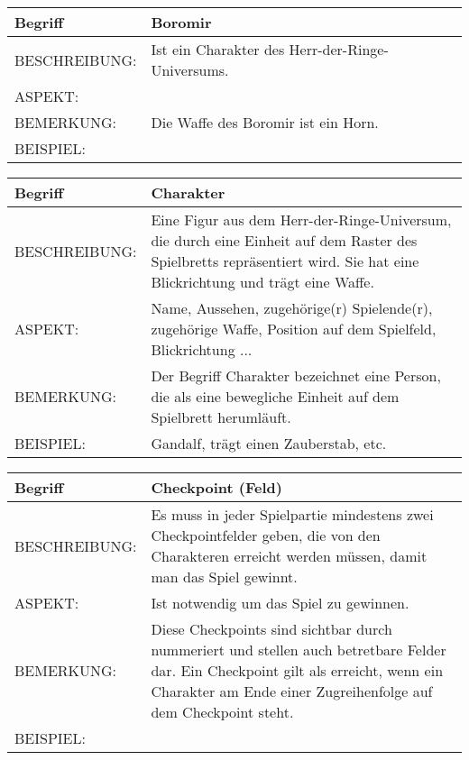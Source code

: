 \documentclass{uulm-assignment}
\begin{document}
	     \begin{tabularx}{\textwidth}{|l|X |} \hline
	        \textbf{Begriff} & \textbf{Boromir} \\
	        \hline
	        BESCHREIBUNG: & Ist ein Charakter des Herr-der-Ringe-Universums.                            \\
	        \hline
	        ASPEKT: &
	        \\
	        \hline
	        BEMERKUNG: & Die Waffe des Boromir ist ein Horn.\\
	        \hline
	        BEISPIEL: & \\
	        \hline
	    \end{tabularx}

	     \begin{tabularx}{\textwidth}{|l|X |} \hline
	        \textbf{Begriff} & \textbf{Charakter} \\
	        \hline
	        BESCHREIBUNG: & Eine Figur aus dem Herr-der-Ringe-Universum, die durch eine Einheit auf dem Raster des Spielbretts repräsentiert wird. Sie hat eine Blickrichtung und trägt eine Waffe. \\
	        \hline
	        ASPEKT: &Name, Aussehen, zugehörige(r) Spielende(r), zugehörige Waffe, Position auf dem Spielfeld, Blickrichtung ...
	        \\
	        \hline
	        BEMERKUNG: & Der Begriff Charakter bezeichnet eine Person, die als eine bewegliche Einheit auf dem Spielbrett herumläuft.\\
	        \hline
	        BEISPIEL: & Gandalf, trägt einen Zauberstab, etc.\\
	        \hline
	    \end{tabularx}

	     \begin{tabularx}{\textwidth}{|l|X |} \hline
	        \textbf{Begriff} & \textbf{Checkpoint (Feld)} \\
	        \hline
	        BESCHREIBUNG: & Es muss in jeder Spielpartie mindestens zwei Checkpointfelder geben, die von den Charakteren erreicht werden müssen, damit man das Spiel gewinnt. \\
	        \hline
	        ASPEKT: & Ist notwendig um das Spiel zu gewinnen.
	        \\
	        \hline
	        BEMERKUNG: & Diese Checkpoints sind sichtbar durch nummeriert und stellen auch betretbare Felder dar. Ein Checkpoint gilt als erreicht, wenn ein Charakter am Ende einer Zugreihenfolge auf dem Checkpoint steht.\\
	        \hline
	        BEISPIEL: & \\
	        \hline
	    \end{tabularx}
\end{document}
